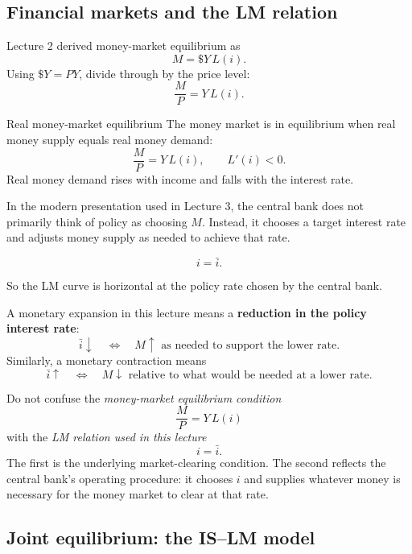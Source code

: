 \subsection{Financial markets and the LM relation}

Lecture 2 derived money-market equilibrium as
\[
M = \$Y\,L(i).
\]
Using $\$Y = PY$, divide through by the price level:
\[
\frac{M}{P}=Y\,L(i).
\]

\begin{definition}{Real money-market equilibrium}{}
The money market is in equilibrium when real money supply equals real money demand:
\[
\frac{M}{P}=Y\,L(i),
\qquad
L'(i)<0.
\]
Real money demand rises with income and falls with the interest rate.
\end{definition}

\noindent
In the modern presentation used in Lecture 3, the central bank does not primarily think of policy as choosing $M$. Instead, it chooses a target interest rate and adjusts money supply as needed to achieve that rate.

\begin{keyformula}[title={Key Formula: LM relation under interest-rate targeting}]
\[
i=\bar{i}.
\]
\end{keyformula}

\noindent
So the LM curve is horizontal at the policy rate chosen by the central bank.

\begin{policynote}
A monetary expansion in this lecture means a \textbf{reduction in the policy interest rate}:
\[
\bar{i}\downarrow
\quad\Longleftrightarrow\quad
M\uparrow \text{ as needed to support the lower rate.}
\]
Similarly, a monetary contraction means
\[
\bar{i}\uparrow
\quad\Longleftrightarrow\quad
M\downarrow \text{ relative to what would be needed at a lower rate.}
\]
\end{policynote}

\begin{commonmistake}
Do not confuse the \emph{money-market equilibrium condition}
\[
\frac{M}{P}=Y\,L(i)
\]
with the \emph{LM relation used in this lecture}
\[
i=\bar{i}.
\]
The first is the underlying market-clearing condition. The second reflects the central bank's operating procedure: it chooses $i$ and supplies whatever money is necessary for the money market to clear at that rate.
\end{commonmistake}

\subsection{Joint equilibrium: the IS--LM model}

